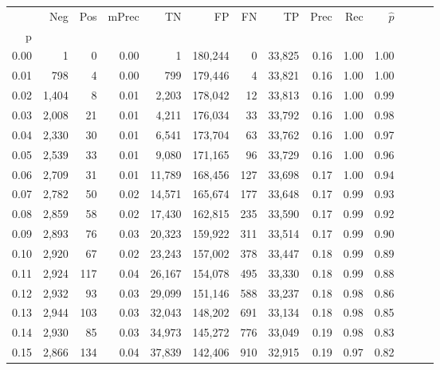 \begin{tabular}{rrrrrrrrrrrrrr}
\toprule
{} &    Neg &  Pos & mPrec &       TN &       FP &      FN &      TP &  Prec &   Rec & $\hat{p}$ \\
p    &        &      &       &          &          &         &         &       &       &           \\
\midrule
0.00 &      1 &    0 &  0.00 &        1 &  180,244 &       0 &  33,825 &  0.16 &  1.00 &      1.00 \\
0.01 &    798 &    4 &  0.00 &      799 &  179,446 &       4 &  33,821 &  0.16 &  1.00 &      1.00 \\
0.02 &  1,404 &    8 &  0.01 &    2,203 &  178,042 &      12 &  33,813 &  0.16 &  1.00 &      0.99 \\
0.03 &  2,008 &   21 &  0.01 &    4,211 &  176,034 &      33 &  33,792 &  0.16 &  1.00 &      0.98 \\
0.04 &  2,330 &   30 &  0.01 &    6,541 &  173,704 &      63 &  33,762 &  0.16 &  1.00 &      0.97 \\
0.05 &  2,539 &   33 &  0.01 &    9,080 &  171,165 &      96 &  33,729 &  0.16 &  1.00 &      0.96 \\
0.06 &  2,709 &   31 &  0.01 &   11,789 &  168,456 &     127 &  33,698 &  0.17 &  1.00 &      0.94 \\
0.07 &  2,782 &   50 &  0.02 &   14,571 &  165,674 &     177 &  33,648 &  0.17 &  0.99 &      0.93 \\
0.08 &  2,859 &   58 &  0.02 &   17,430 &  162,815 &     235 &  33,590 &  0.17 &  0.99 &      0.92 \\
0.09 &  2,893 &   76 &  0.03 &   20,323 &  159,922 &     311 &  33,514 &  0.17 &  0.99 &      0.90 \\
0.10 &  2,920 &   67 &  0.02 &   23,243 &  157,002 &     378 &  33,447 &  0.18 &  0.99 &      0.89 \\
0.11 &  2,924 &  117 &  0.04 &   26,167 &  154,078 &     495 &  33,330 &  0.18 &  0.99 &      0.88 \\
0.12 &  2,932 &   93 &  0.03 &   29,099 &  151,146 &     588 &  33,237 &  0.18 &  0.98 &      0.86 \\
0.13 &  2,944 &  103 &  0.03 &   32,043 &  148,202 &     691 &  33,134 &  0.18 &  0.98 &      0.85 \\
0.14 &  2,930 &   85 &  0.03 &   34,973 &  145,272 &     776 &  33,049 &  0.19 &  0.98 &      0.83 \\
0.15 &  2,866 &  134 &  0.04 &   37,839 &  142,406 &     910 &  32,915 &  0.19 &  0.97 &      0.82 \\

\end{tabular}
